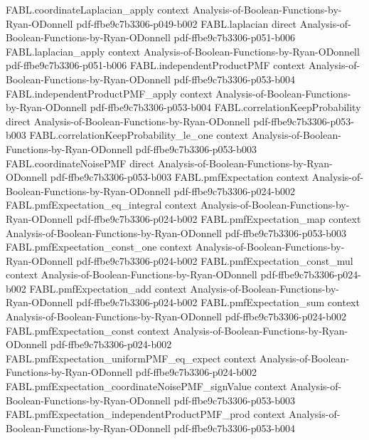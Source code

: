 \begin{theorem}
  {FABL.coordinateLaplacian_apply}
  {context}
  {Analysis-of-Boolean-Functions-by-Ryan-ODonnell}
  {pdf-ffbe9c7b3306-p049-b002}
\proofstep
  {FABL.laplacian}
  {direct}
  {Analysis-of-Boolean-Functions-by-Ryan-ODonnell}
  {pdf-ffbe9c7b3306-p051-b006}
\proofstep
  {FABL.laplacian_apply}
  {context}
  {Analysis-of-Boolean-Functions-by-Ryan-ODonnell}
  {pdf-ffbe9c7b3306-p051-b006}
\proofstep
  {FABL.independentProductPMF}
  {context}
  {Analysis-of-Boolean-Functions-by-Ryan-ODonnell}
  {pdf-ffbe9c7b3306-p053-b004}
\proofstep
  {FABL.independentProductPMF_apply}
  {context}
  {Analysis-of-Boolean-Functions-by-Ryan-ODonnell}
  {pdf-ffbe9c7b3306-p053-b004}
\proofstep
  {FABL.correlationKeepProbability}
  {direct}
  {Analysis-of-Boolean-Functions-by-Ryan-ODonnell}
  {pdf-ffbe9c7b3306-p053-b003}
\proofstep
  {FABL.correlationKeepProbability_le_one}
  {context}
  {Analysis-of-Boolean-Functions-by-Ryan-ODonnell}
  {pdf-ffbe9c7b3306-p053-b003}
\proofstep
  {FABL.coordinateNoisePMF}
  {direct}
  {Analysis-of-Boolean-Functions-by-Ryan-ODonnell}
  {pdf-ffbe9c7b3306-p053-b003}
\proofstep
  {FABL.pmfExpectation}
  {context}
  {Analysis-of-Boolean-Functions-by-Ryan-ODonnell}
  {pdf-ffbe9c7b3306-p024-b002}
\proofstep
  {FABL.pmfExpectation_eq_integral}
  {context}
  {Analysis-of-Boolean-Functions-by-Ryan-ODonnell}
  {pdf-ffbe9c7b3306-p024-b002}
\proofstep
  {FABL.pmfExpectation_map}
  {context}
  {Analysis-of-Boolean-Functions-by-Ryan-ODonnell}
  {pdf-ffbe9c7b3306-p053-b003}
\proofstep
  {FABL.pmfExpectation_const_one}
  {context}
  {Analysis-of-Boolean-Functions-by-Ryan-ODonnell}
  {pdf-ffbe9c7b3306-p024-b002}
\proofstep
  {FABL.pmfExpectation_const_mul}
  {context}
  {Analysis-of-Boolean-Functions-by-Ryan-ODonnell}
  {pdf-ffbe9c7b3306-p024-b002}
\proofstep
  {FABL.pmfExpectation_add}
  {context}
  {Analysis-of-Boolean-Functions-by-Ryan-ODonnell}
  {pdf-ffbe9c7b3306-p024-b002}
\proofstep
  {FABL.pmfExpectation_sum}
  {context}
  {Analysis-of-Boolean-Functions-by-Ryan-ODonnell}
  {pdf-ffbe9c7b3306-p024-b002}
\proofstep
  {FABL.pmfExpectation_const}
  {context}
  {Analysis-of-Boolean-Functions-by-Ryan-ODonnell}
  {pdf-ffbe9c7b3306-p024-b002}
\proofstep
  {FABL.pmfExpectation_uniformPMF_eq_expect}
  {context}
  {Analysis-of-Boolean-Functions-by-Ryan-ODonnell}
  {pdf-ffbe9c7b3306-p024-b002}
\proofstep
  {FABL.pmfExpectation_coordinateNoisePMF_signValue}
  {context}
  {Analysis-of-Boolean-Functions-by-Ryan-ODonnell}
  {pdf-ffbe9c7b3306-p053-b003}
\proofstep
  {FABL.pmfExpectation_independentProductPMF_prod}
  {context}
  {Analysis-of-Boolean-Functions-by-Ryan-ODonnell}
  {pdf-ffbe9c7b3306-p053-b004}

\end{theorem}
